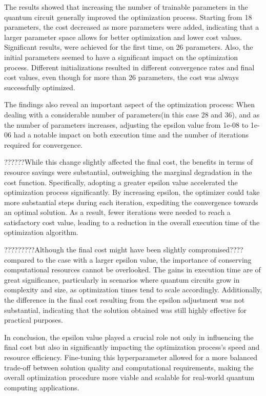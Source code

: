 \documentclass[inscr,ack,preface]{diphdthesis}
\begin{document}
The results showed that increasing the number of trainable parameters in the quantum circuit generally improved the optimization process. Starting from 18 parameters, the cost decreased as more parameters were added, indicating that a larger parameter space allows for better optimization and lower cost values. Significant results, were achieved for the first time, on 26 parameters. Also, the initial parameters seemed to have a significant impact on the optimization process. Different initializations resulted in different convergence rates and final cost values, even though for more than 26 parameters, the cost was always successfully optimized.

The findings also reveal an important aspect of the optimization process: When dealing with a considerable number of parameters(in this case 28 and 36), and as the number of parameters increases, adjusting the epsilon value from 1e-08 to 1e-06 had a notable impact on both execution time and the number of iterations required for convergence. 

??????While this change slightly affected the final cost, the benefits in terms of resource savings were substantial, outweighing the marginal degradation in the cost function. Specifically, adopting a greater epsilon value accelerated the optimization process significantly. By increasing epsilon, the optimizer could take more substantial steps during each iteration, expediting the convergence towards an optimal solution. As a result, fewer iterations were needed to reach a satisfactory cost value, leading to a reduction in the overall execution time of the optimization algorithm.

?????????Although the final cost might have been slightly compromised???? compared to the case with a larger epsilon value, the importance of conserving computational resources cannot be overlooked. The gains in execution time are of great significance, particularly in scenarios where quantum circuits grow in complexity and size, as optimization times tend to scale accordingly. Additionally, the difference in the final cost resulting from the epsilon adjustment was not substantial, indicating that the solution obtained was still highly effective for practical purposes.

In conclusion, the epsilon value played a crucial role not only in influencing the final cost but also in significantly impacting the optimization process's speed and resource efficiency. Fine-tuning this hyperparameter allowed for a more balanced trade-off between solution quality and computational requirements, making the overall optimization procedure more viable and scalable for real-world quantum computing applications. 
\end{document}

